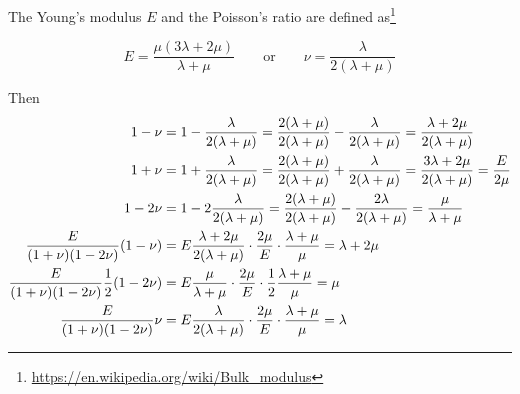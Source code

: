 The Young's modulus $E$ and the Poisson's ratio are defined 
as\footnote{\url{https://en.wikipedia.org/wiki/Bulk_modulus}}
\begin{mdframed}[backgroundcolor=blue!5]
\begin{equation}
E=\frac{\mu(3\lambda+2\mu)}{\lambda+\mu}
\qquad
\textrm{or}
\qquad
\nu=\frac{\lambda}{2(\lambda+\mu)}
\end{equation}
\end{mdframed}

Then 
\begin{align}
1-\nu
&=1-\frac{\lambda}{2(\lambda+\mu)}
=\frac{2(\lambda+\mu)}{2(\lambda+\mu)}-\frac{\lambda}{2(\lambda+\mu)}
=\frac{\lambda+2\mu}{2(\lambda+\mu)} \nn\\
1+\nu 
&= 1+\frac{\lambda}{2(\lambda+\mu)}
= \frac{2(\lambda+\mu)}{2(\lambda+\mu)}+\frac{\lambda}{2(\lambda+\mu)}
= \frac{3\lambda+2\mu}{2(\lambda+\mu)}
= \frac{E}{2\mu} \nn\\
1-2\nu 
&=1 -2 \frac{\lambda}{2(\lambda+\mu)} 
= \frac{2(\lambda+\mu)}{2(\lambda+\mu)}-\frac{2\lambda}{2(\lambda+\mu)}
= \frac{\mu}{\lambda+\mu} 
\nn\\ %
\frac{E}{(1+\nu)(1-2\nu)}(1-\nu)
&=
E
\frac{\lambda+2\mu}{2(\lambda+\mu)}
\cdot
\frac{2\mu}{E}
\cdot
\frac{\lambda+\mu}{\mu}
=\lambda+2\mu 
\nn\\ %
\frac{E}{(1+\nu)(1-2\nu)} \frac12(1-2\nu)
&=
E
\frac{\mu}{\lambda+\mu}
\cdot
\frac{2\mu}{E}
\cdot
\frac12 \frac{\lambda+\mu}{\mu} 
= \mu 
\nn\\ %
\frac{E}{(1+\nu)(1-2\nu)} \nu
&=
E\frac{\lambda}{2(\lambda+\mu)}
\cdot
\frac{2\mu}{E}
\cdot
\frac{\lambda+\mu}{\mu} 
= \lambda \nn
\end{align}

